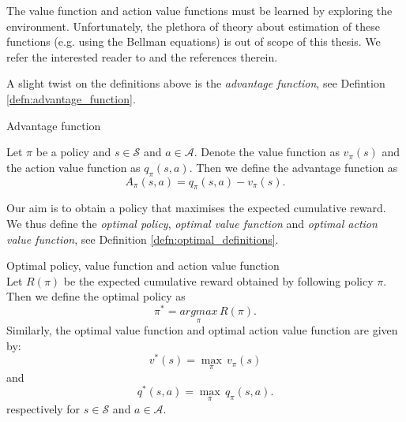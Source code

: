 The value function and action value functions must be learned by exploring the environment. Unfortunately, the plethora of theory about estimation of these functions (e.g. using the Bellman equations) is out of scope of this thesis. We refer the interested reader to \cite[Section 3.5.]{sutton2018reinforcement} and the references therein. 

A slight twist on the definitions above is the \textit{advantage function}, see Defintion \ref{defn:advantage_function}.
\begin{defn}{Advantage function} \cite[Section 3]{a3c_paper}
\label{defn:advantage_function}

Let $\pi$ be a policy and $s \in \mathcal{S}$ and $a \in \mathcal{A}$. Denote the value function as $v_{\pi}(s)$ and the action value function as $q_{\pi}(s,a)$. Then we define the advantage function  as
\begin{equation}
 A_{\pi}(s,a) = q_{\pi}(s,a) - v_{\pi}(s).
\end{equation}
\end{defn}

Our aim is to obtain a policy that maximises the expected cumulative reward. We thus define the \textit{optimal policy}, \textit{optimal value function} and \textit{optimal action value function}, see Definition \ref{defn:optimal_definitions}.

\begin{defn}{Optimal policy, value function and action value function} \cite[Section 3.6]{sutton2018reinforcement}
\label{defn:optimal_definitions} \\
Let $R(\pi)$ be the expected cumulative reward obtained by following policy $\pi$. Then we define the optimal policy as
\begin{equation}
 	\pi^* = \underset{\pi}{argmax} \, R(\pi).
\end{equation}
Similarly, the optimal value function and optimal action value function are given by: 
\begin{equation}
 	v^*(s) = \underset{\pi}{\max} \, v_{\pi}(s)
\end{equation}
and
\begin{equation}
 	q^*(s,a) = \underset{\pi}{\max} \, q_{\pi}(s,a).
\end{equation}
respectively for $s \in \mathcal{S}$ and $a \in \mathcal{A}$.
\end{defn}

